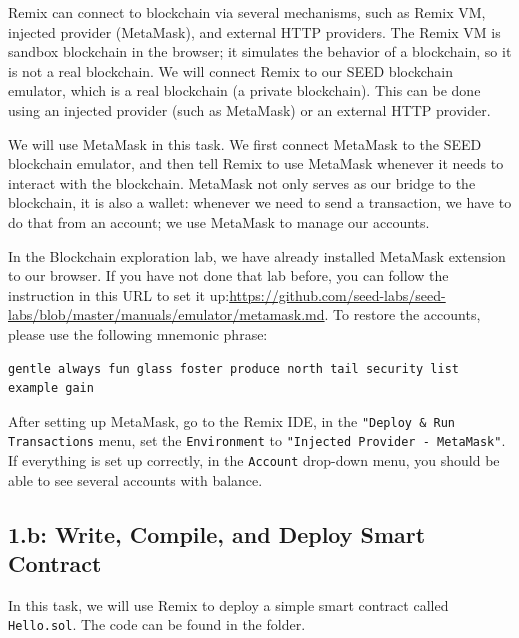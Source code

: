 Remix can connect to blockchain via several mechanisms,
such as Remix VM, injected provider (MetaMask), and external HTTP
providers. The Remix VM is sandbox blockchain in the browser;
it simulates the behavior of a blockchain, so 
it is not a real blockchain.
We will connect Remix to our SEED blockchain emulator, which
is a real blockchain (a private blockchain). This can be done using an injected 
provider (such as MetaMask) or an external HTTP provider. 


We will use MetaMask in this task. We first connect MetaMask
to the SEED blockchain emulator, and then tell Remix to use
MetaMask whenever it needs to interact with the blockchain. 
MetaMask not only serves as our bridge to the blockchain, it is 
also a wallet: whenever we need to send a transaction,
we have to do that from an account; we use MetaMask
to manage our accounts. 

In the Blockchain exploration lab, we have already installed
MetaMask extension to our browser. If you have not done that
lab before, you can follow the instruction in 
this URL to set it up:\url{https://github.com/seed-labs/seed-labs/blob/master/manuals/emulator/metamask.md}. To restore the 
accounts, please use the following mnemonic phrase:


\begin{lstlisting}
gentle always fun glass foster produce north tail security list example gain
\end{lstlisting}
 

After setting up MetaMask, go to the Remix IDE, 
in the \texttt{"Deploy \& Run Transactions} menu,
set the \texttt{Environment} to \texttt{"Injected Provider - MetaMask"}.  
If everything is set up correctly, in the \texttt{Account} drop-down menu,
you should be able to see several accounts with balance. 


\subsection{1.b: Write, Compile, and Deploy Smart Contract} 

In this task, we will use Remix to deploy a simple smart contract
called \texttt{Hello.sol}. The code can be found in 
the \contractfolder folder.


